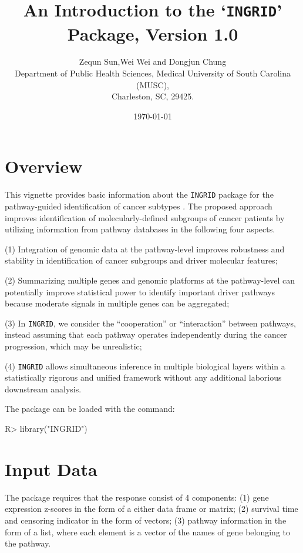 \documentclass[11pt]{article}
\title{An Introduction to the `\texttt{INGRID}' Package, Version 1.0}
\author{Zequn Sun,Wei Wei and Dongjun Chung\\
Department of Public Health Sciences, Medical University of South Carolina (MUSC),\\
  Charleston, SC, 29425.}
\date{\today}
\begin{document}

\maketitle

\section{Overview}

This vignette provides basic information about the
\texttt{INGRID} package for the pathway-guided identification of cancer subtypes \cite{INGRID}. The proposed approach improves identification of molecularly-defined subgroups of cancer patients by utilizing information from pathway databases in the following four aspects.

(1) Integration of genomic data at the pathway-level improves robustness and stability in identification of cancer subgroups and driver molecular features;

(2) Summarizing multiple genes and genomic platforms at the pathway-level can potentially improve statistical power to identify important driver pathways because moderate signals in multiple genes can be aggregated;

(3) In \texttt{INGRID}, we consider the ``cooperation'' or ``interaction'' between pathways, instead assuming that each pathway operates independently during the cancer progression, which may be unrealistic;

(4) \texttt{INGRID} allows simultaneous inference in multiple biological layers within a statistically rigorous and unified framework without any additional laborious downstream analysis.

The package can be loaded with the command:


\begin{Schunk}
\begin{Sinput}
R> library("INGRID")
\end{Sinput}
\end{Schunk}

\section{Input Data}

The package requires that the response consist of 4 components:
(1) gene expression z-scores in the form of a either data frame or matrix;
(2) survival time and censoring indicator in the form of vectors;
(3) pathway information in the form of a list, where each element is a vector of the names of gene belonging to the pathway.
\end{document}
